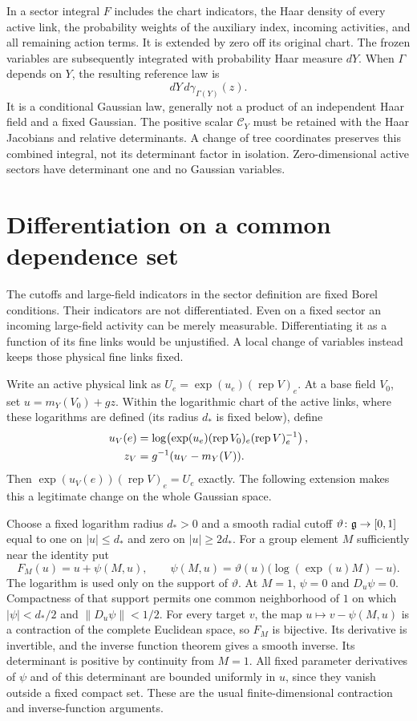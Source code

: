 In a sector integral $F$ includes the chart indicators, the Haar density
of every active link, the probability weights of the auxiliary index, incoming activities, and all
remaining action terms. It is extended by zero off its original chart.
The frozen variables are subsequently integrated with probability Haar
measure $dY$. When $\Gamma$ depends on $Y$, the resulting reference law is
\[
 dY\,d\gamma_{\Gamma(Y)}(z).
\]
It is a conditional Gaussian law, generally not a product of an independent
Haar field and a fixed Gaussian. The positive scalar $\mathcal C_Y$ must
be retained with the Haar Jacobians and relative determinants. A change of
tree coordinates preserves this combined integral, not its determinant
factor in isolation. Zero-dimensional active sectors have determinant one
and no Gaussian variables.

\section{Differentiation on a common dependence set}

The cutoffs and large-field indicators in the sector definition are fixed Borel conditions.
Their indicators are not differentiated. Even on a fixed sector an
incoming large-field activity can be merely measurable. Differentiating
it as a function of its fine links would be unjustified. A local change
of variables instead keeps those physical fine links fixed.

Write an active physical link as $U_e=\exp(u_e)(\operatorname{rep}V)_e$.
At a base field $V_0$, set $u=m_Y(V_0)+gz$. Within the logarithmic chart of the active links, where these logarithms are defined (its radius $d_*$ is fixed below), define
\begin{align}
 u_V(e)&=\log\!\left(\exp(u_e)(\operatorname{rep}V_0)_e
                                  (\operatorname{rep}V)_e^{-1}\right),\notag\\
 z_V&=g^{-1}(u_V-m_Y(V)).
 \label{ch06:protected-change}
\end{align}
Then $\exp(u_V(e))(\operatorname{rep}V)_e=U_e$ exactly. The following
extension makes this a legitimate change on the whole Gaussian space.

Choose a fixed logarithm radius $d_*>0$ and a smooth radial cutoff
$\vartheta\colon\mathfrak g\to[0,1]$ equal to one on $|u|\le d_*$ and zero on $|u|\ge2d_*$. For a
group element $M$ sufficiently near the identity put
\[
 F_M(u)=u+\psi(M,u),\qquad
 \psi(M,u)=\vartheta(u)\bigl(\log(\exp(u)M)-u\bigr).
\]
The logarithm is used only on the support of $\vartheta$. At $M=1$,
$\psi=0$ and $D_u\psi=0$. Compactness of that support permits one common
neighborhood of $1$ on which
$|\psi|<d_*/2$ and $\|D_u\psi\|<1/2$.
For every target $v$, the map $u\mapsto v-\psi(M,u)$ is a contraction
of the complete Euclidean space, so $F_M$ is bijective.
Its derivative is invertible, and the inverse function theorem gives a
smooth inverse. Its determinant is positive by continuity from $M=1$.
All fixed parameter derivatives of $\psi$ and of this determinant are
bounded uniformly in $u$, since they vanish outside a fixed compact set.
These are the usual finite-dimensional contraction and inverse-function
arguments.

